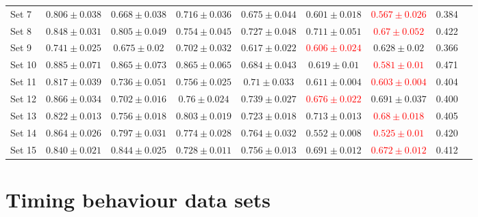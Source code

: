 {\begin{tabular}{lcccccccc}
Set 7  & $0.806 \pm 0.038$ & $0.668 \pm 0.038$ & $0.716 \pm 0.036$                        & $0.675 \pm 0.044$                         & $0.601 \pm 0.018$                         & \textcolor{red}{$0.567 \pm 0.026$} &   0.384       &  \\
Set 8  & $0.848 \pm 0.031$ & $0.805 \pm 0.049$ & $0.754 \pm 0.045$                        & $0.727 \pm 0.048$                         & $0.711 \pm 0.051$                         & \textcolor{red}{$0.67 \pm 0.052$}  &   0.422       &  \\
Set 9  & $0.741 \pm 0.025$ & $0.675 \pm 0.02$  & $0.702 \pm 0.032$                        & $0.617 \pm 0.022$                         & \textcolor{red}{$0.606 \pm 0.024$} & $0.628 \pm 0.02$                          &   0.366       &  \\
Set 10 & $0.885 \pm 0.071$ & $0.865 \pm 0.073$ & $0.865 \pm 0.065$                        & $0.684 \pm 0.043$                         & $0.619 \pm 0.01$                          & \textcolor{red}{$0.581 \pm 0.01$}    & 0.471       &  \\
Set 11 & $0.817 \pm 0.039$ & $0.736 \pm 0.051$ & $0.756 \pm 0.025$                        & $0.71 \pm 0.033$                          & $0.611 \pm 0.004$                         & \textcolor{red}{$0.603 \pm 0.004$}   & 0.404       &  \\
Set 12 & $0.866 \pm 0.034$ & $0.702 \pm 0.016$ & $0.76 \pm 0.024$                         & $0.739 \pm 0.027$                         & \textcolor{red}{$0.676 \pm 0.022$} & $0.691 \pm 0.037$                         &   0.400       &  \\
Set 13 & $0.822 \pm 0.013$ & $0.756 \pm 0.018$ & $0.803 \pm 0.019$                        & $0.723 \pm 0.018$                         & $0.713 \pm 0.013$                         & \textcolor{red}{$0.68 \pm 0.018$}  &   0.405       &  \\
Set 14 & $0.864 \pm 0.026$ & $0.797 \pm 0.031$ & $0.774 \pm 0.028$                        & $0.764 \pm 0.032$                         & $0.552 \pm 0.008$                         & \textcolor{red}{$0.525 \pm 0.01$}  &   0.420       &  \\
Set 15 & $0.840 \pm 0.021$ & $0.844 \pm 0.025$ & $0.728 \pm 0.011$                        & $0.756 \pm 0.013$                         & $0.691 \pm 0.012$                         & \textcolor{red}{$0.672 \pm 0.012$} &   0.412       & \\ %
\end{tabular}
}

\chapter{Timing behaviour data sets}



